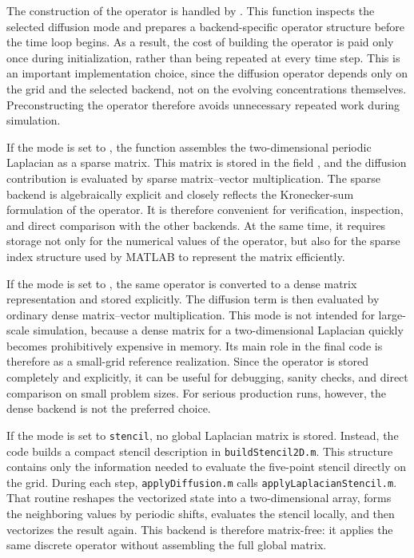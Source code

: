 The construction of the operator is handled by . This function inspects the selected diffusion mode and prepares a backend-specific operator structure before the time loop begins. As a result, the cost of building the operator is paid only once during initialization, rather than being repeated at every time step. This is an important implementation choice, since the diffusion operator depends only on the grid and the selected backend, not on the evolving concentrations themselves. Preconstructing the operator therefore avoids unnecessary repeated work during simulation.

If the mode is set to , the function  assembles the two-dimensional periodic Laplacian as a sparse matrix. This matrix is stored in the field , and the diffusion contribution is evaluated by sparse matrix--vector multiplication. The sparse backend is algebraically explicit and closely reflects the Kronecker-sum formulation of the operator. It is therefore convenient for verification, inspection, and direct comparison with the other backends. At the same time, it requires storage not only for the numerical values of the operator, but also for the sparse index structure used by MATLAB to represent the matrix efficiently.

If the mode is set to , the same operator is converted to a dense matrix representation and stored explicitly. The diffusion term is then evaluated by ordinary dense matrix--vector multiplication. This mode is not intended for large-scale simulation, because a dense matrix for a two-dimensional Laplacian quickly becomes prohibitively expensive in memory. Its main role in the final code is therefore as a small-grid reference realization. Since the operator is stored completely and explicitly, it can be useful for debugging, sanity checks, and direct comparison on small problem sizes. For serious production runs, however, the dense backend is not the preferred choice.

If the mode is set to \texttt{stencil}, no global Laplacian matrix is stored. Instead, the code builds a compact stencil description in \texttt{buildStencil2D.m}. This structure contains only the information needed to evaluate the five-point stencil directly on the grid. During each step, \texttt{applyDiffusion.m} calls \texttt{applyLaplacianStencil.m}. That routine reshapes the vectorized state into a two-dimensional array, forms the neighboring values by periodic shifts, evaluates the stencil locally, and then vectorizes the result again. This backend is therefore matrix-free: it applies the same discrete operator without assembling the full global matrix.

